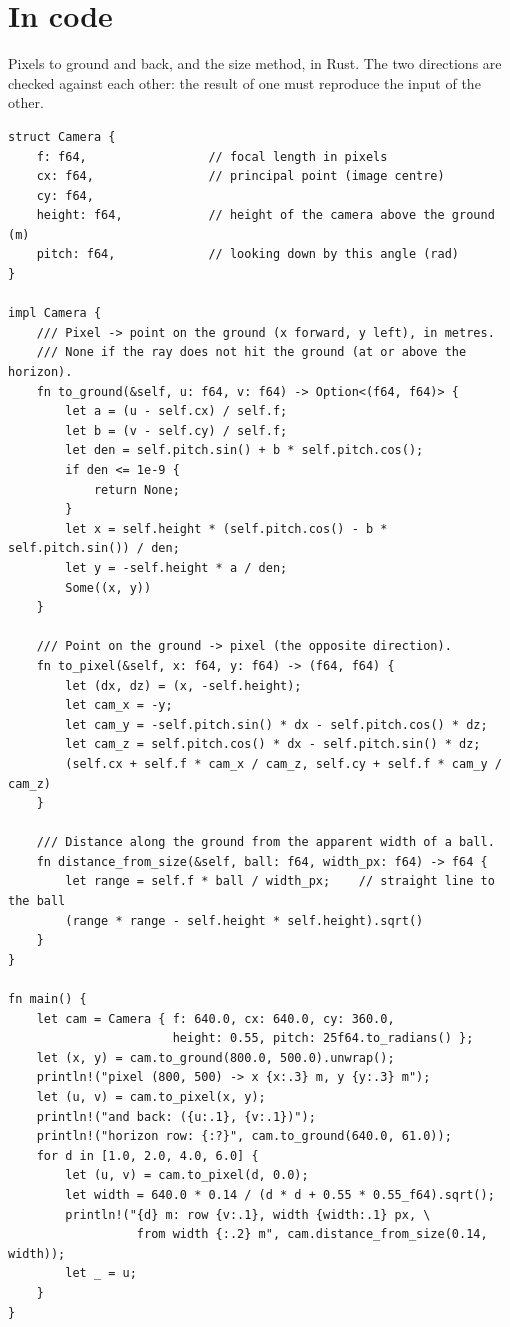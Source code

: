 \section*{In code}
Pixels to ground and back, and the size method, in Rust. The two directions are checked against each other: the result of one must reproduce the input of the other.
\begin{verbatim}
struct Camera {
    f: f64,                 // focal length in pixels
    cx: f64,                // principal point (image centre)
    cy: f64,
    height: f64,            // height of the camera above the ground (m)
    pitch: f64,             // looking down by this angle (rad)
}

impl Camera {
    /// Pixel -> point on the ground (x forward, y left), in metres.
    /// None if the ray does not hit the ground (at or above the horizon).
    fn to_ground(&self, u: f64, v: f64) -> Option<(f64, f64)> {
        let a = (u - self.cx) / self.f;
        let b = (v - self.cy) / self.f;
        let den = self.pitch.sin() + b * self.pitch.cos();
        if den <= 1e-9 {
            return None;
        }
        let x = self.height * (self.pitch.cos() - b * self.pitch.sin()) / den;
        let y = -self.height * a / den;
        Some((x, y))
    }

    /// Point on the ground -> pixel (the opposite direction).
    fn to_pixel(&self, x: f64, y: f64) -> (f64, f64) {
        let (dx, dz) = (x, -self.height);
        let cam_x = -y;
        let cam_y = -self.pitch.sin() * dx - self.pitch.cos() * dz;
        let cam_z = self.pitch.cos() * dx - self.pitch.sin() * dz;
        (self.cx + self.f * cam_x / cam_z, self.cy + self.f * cam_y / cam_z)
    }

    /// Distance along the ground from the apparent width of a ball.
    fn distance_from_size(&self, ball: f64, width_px: f64) -> f64 {
        let range = self.f * ball / width_px;    // straight line to the ball
        (range * range - self.height * self.height).sqrt()
    }
}

fn main() {
    let cam = Camera { f: 640.0, cx: 640.0, cy: 360.0,
                       height: 0.55, pitch: 25f64.to_radians() };
    let (x, y) = cam.to_ground(800.0, 500.0).unwrap();
    println!("pixel (800, 500) -> x {x:.3} m, y {y:.3} m");
    let (u, v) = cam.to_pixel(x, y);
    println!("and back: ({u:.1}, {v:.1})");
    println!("horizon row: {:?}", cam.to_ground(640.0, 61.0));
    for d in [1.0, 2.0, 4.0, 6.0] {
        let (u, v) = cam.to_pixel(d, 0.0);
        let width = 640.0 * 0.14 / (d * d + 0.55 * 0.55_f64).sqrt();
        println!("{d} m: row {v:.1}, width {width:.1} px, \
                  from width {:.2} m", cam.distance_from_size(0.14, width));
        let _ = u;
    }
}
\end{verbatim}
